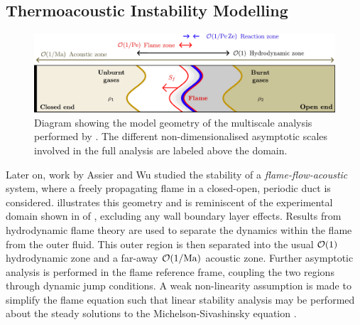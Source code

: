 \subsection{Thermoacoustic Instability Modelling}

\begin{figure}[t]
\centering
\includegraphics[scale=0.65]{assets/imgs/AW-flame.pdf}
\caption{Diagram showing the model geometry of the multiscale analysis performed by \cite{assier2014LinearWeaklyNonlinear}. The different non-dimensionalised asymptotic scales involved in the full analysis are labeled above the domain.}
\label{fig:AW-flame}
\end{figure}

Later on, work by Assier and Wu \cite{assier2014LinearWeaklyNonlinear} studied the stability of a \emph{flame-flow-acoustic} system, where a freely propagating flame in a closed-open, periodic duct is considered.  illustrates this geometry and is reminiscent of the experimental domain shown in  of \cite{searby1992AcousticInstabilityPremixed}, excluding any wall boundary layer effects. Results from hydrodynamic flame theory \cite{matalon1982FlamesGasdynamicDiscontinuities,clavin1982EffectsMolecularDiffusion} are used to separate the dynamics within the flame from the outer fluid. This outer region is then separated into the usual $\mathcal{O}(1)$ hydrodynamic zone and a far-away $\mathcal{O}(1/\mathrm{Ma})$ acoustic zone. Further asymptotic analysis is performed in the flame reference frame, coupling the two regions through dynamic jump conditions. A weak non-linearity assumption is made to simplify the flame equation such that linear stability analysis may be performed about the steady solutions to the Michelson-Sivashinsky equation \cite{sivashinsky1977NonlinearAnalysisHydrodynamic,michelson1977NonlinearAnalysisHydrodynamic,matalon2018DarrieusLandauInstability}.

